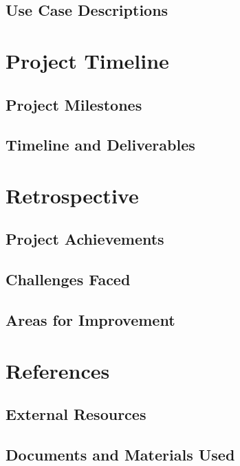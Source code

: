 \documentclass{report}
\begin{document}
\section{Use Case Descriptions}

\chapter{Project Timeline}
\section{Project Milestones}
\section{Timeline and Deliverables}

\chapter{Retrospective}
\section{Project Achievements}
\section{Challenges Faced}
\section{Areas for Improvement}

\chapter{References}
\section{External Resources}
\section{Documents and Materials Used}
\end{document}
